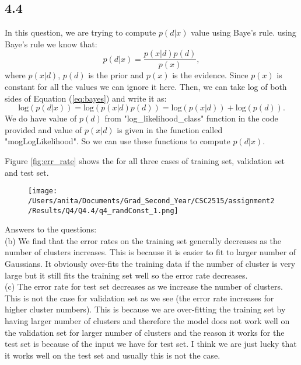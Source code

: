 \documentclass[10pt]{article}
\begin{document}
\subsection*{4.4}
In this question, we are trying to compute $p(d|x)$ value using Baye's rule. using Baye's rule we know that:
\begin{equation}\label{eq:bayes}
p(d|x) = \frac{p(x|d) p(d)}{p(x)},
\end{equation}
where $p(x|d)$, $p(d)$ is the prior and $p(x)$ is the evidence. Since $p(x)$ is constant for all the values we can ignore it here. Then, we can take log of both sides of Equation (\ref{eq:bayes}) and write it as:
\begin{equation}
\mathrm{log} (p(d|x)) = \mathrm{log}(p(x|d) p(d)) = \mathrm{log}(p(x|d)) + \mathrm{log}(p(d)).
\end{equation} 
We do have value of $p(d)$ from "log\_likelihood\_class" function in the code provided and value of $p(x|d)$ is given in the function called "mogLogLikelihood". So we can use these functions to compute $p(d|x)$.

Figure \ref{fig:err_rate} shows the for all three cases of training set, validation set and test set.
\begin{figure}[H]
	\centering
	\texttt{[image: /Users/anita/Documents/Grad\_Second\_Year/CSC2515/assignment2/Results/Q4/Q4.4/q4\_randConst\_1.png]}
	\caption{}
	\label{fig:4.4}
\end{figure}



Answers to the questions: \\

(b) We find that the error rates on the training set generally decreases as the number of clusters increases. This is because it is easier to fit to larger number of Gaussians. It obviously over-fits the training data if the number of cluster is very large but it still fits the training set well so the error rate decreases. \\

(c) The error rate for test set decreases as we increase the number of clusters. This is not the case for validation set as we see (the error rate increases for higher cluster numbers). This is because we are over-fitting the training set by having larger number of clusters and therefore the model does not work well on the validation set for larger number of clusters and the reason it works for the test set is because of the input we have for test set. I think we are just lucky that it works well on the test set and usually this is not the case.
\end{document}
